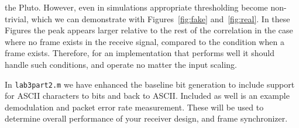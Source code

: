 \documentclass[letterpaper,12pt]{article}
\begin{document}
the Pluto.  However, even in simulations appropriate thresholding become non-trivial, which we can 
demonstrate with Figures~\ref{fig:fake} and~\ref{fig:real}.  In these Figures the peak appears larger relative to 
the rest of the correlation in the case where no frame exists in the receive signal, compared to the 
condition when a frame exists.  Therefore, for an implementation that performs well it should handle such 
conditions, and operate no matter the input scaling.\par
%
In \texttt{lab3part2.m} we have enhanced the baseline bit generation to include support for ASCII characters to bits and back to ASCII.  Included as well is an example demodulation and packet error rate measurement.  These will be used to determine overall performance of your receiver design, and frame synchronizer.
%
\end{document}
